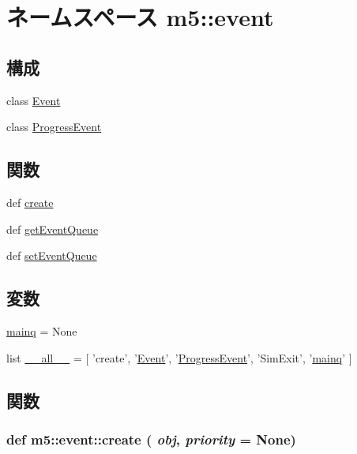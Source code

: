 \hypertarget{namespacem5_1_1event}{
\section{ネームスペース m5::event}
\label{namespacem5_1_1event}
}
\subsection*{構成}
\begin{DoxyCompactItemize}
\item 
class \hyperlink{classm5_1_1event_1_1Event}{Event}
\item 
class \hyperlink{classm5_1_1event_1_1ProgressEvent}{ProgressEvent}
\end{DoxyCompactItemize}
\subsection*{関数}
\begin{DoxyCompactItemize}
\item 
def \hyperlink{namespacem5_1_1event_afaaa251be2cbb03c4e64002054e5bae6}{create}
\item 
def \hyperlink{namespacem5_1_1event_ad99027ec643e20cbd3364b65c1ad8604}{getEventQueue}
\item 
def \hyperlink{namespacem5_1_1event_aac381d168909de61426d8757834e53a9}{setEventQueue}
\end{DoxyCompactItemize}
\subsection*{変数}
\begin{DoxyCompactItemize}
\item 
\hyperlink{namespacem5_1_1event_a65ae9c1bd73171d1b523afb05e66d7e0}{mainq} = None
\item 
list \hyperlink{namespacem5_1_1event_aa4a022e6ddacd362b83964da5cc5d044}{\_\-\_\-all\_\-\_\-} = \mbox{[} 'create', '\hyperlink{classm5_1_1event_1_1Event}{Event}', '\hyperlink{classm5_1_1event_1_1ProgressEvent}{ProgressEvent}', 'SimExit', '\hyperlink{namespacem5_1_1event_a65ae9c1bd73171d1b523afb05e66d7e0}{mainq}' \mbox{]}
\end{DoxyCompactItemize}


\subsection{関数}
\hypertarget{namespacem5_1_1event_afaaa251be2cbb03c4e64002054e5bae6}{
\subsubsection[{create}]{\setlength{\rightskip}{0pt plus 5cm}def m5::event::create ( {\em obj}, \/   {\em priority} = {\ttfamily None})}}
\label{namespacem5_1_1event_afaaa251be2cbb03c4e64002054e5bae6}



